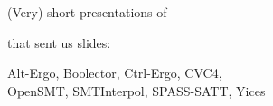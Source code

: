 \documentclass{beamer}
\begin{document}
\begin{frame}{}
(Very) short presentations of

  \begin{center}
    \vfill

    {\huge {}}

    \vfill
  \end{center}

  that sent us slides:

  \vfill

  \begin{center}
    Alt-Ergo, Boolector, Ctrl-Ergo, CVC4,\\ OpenSMT, SMTInterpol, SPASS-SATT, Yices
  \end{center}
\end{frame}

{
  
  
  
  
  
  
  
  
}


\begin{frame}{}
  \begin{center}
    \vfill
      {\huge {}}
    \vfill
  \end{center}
\end{frame}

\end{document}
